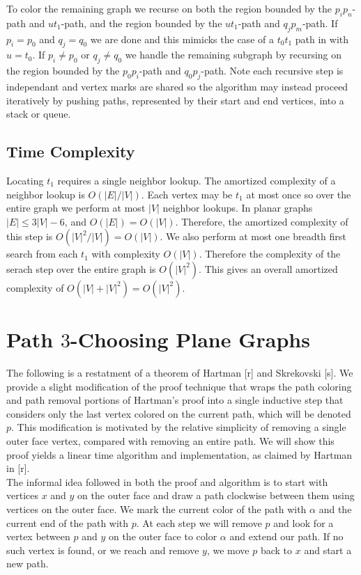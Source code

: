 \documentclass[11pt,letter]{article}
\begin{document}
\noindent To color the remaining graph we recurse on both the region
bounded by the $p_ip_n$-path and $ut_1$-path, and the region bounded by the $ut_1$-path and $q_jp_m$-path.
If $p_i=p_0$ and $q_j=q_0$ we are done and this mimicks the case of a $t_0t_1$ path in with $u=t_0$.
If $p_i\ne p_0$ or $q_j\ne q_0$ we handle the remaining subgraph by recursing on the region bounded by the
$p_0p_i$-path and $q_0p_j$-path. Note each recursive step is independant and vertex marks are shared so the
algorithm may instead proceed iteratively by pushing paths, represented by their start and end
vertices, into a stack or queue.

\subsection*{Time Complexity}

\noindent Locating $t_1$ requires a single neighbor lookup. The amortized complexity of a neighbor lookup is
$O(|E|/|V|)$. Each vertex may be $t_1$ at most once so over the entire graph we perform at most $|V|$ neighbor
lookups. In planar graphs $|E|\le 3|V|-6$, and $O(|E|)=O(|V|)$. Therefore, the
amortized complexity of this step is $O(|V|^2/|V|)=O(|V|)$. We also perform at most one breadth first
search from each $t_1$ with complexity $O(|V|)$. Therefore the complexity of the serach step over the
entire graph is $O(|V|^2)$. This gives an overall amortized complexity of $O(|V|+|V|^2)=O(|V|^2)$.

\section{Path $3$-Choosing Plane Graphs}

The following is a restatment of a theorem of Hartman [r] and Skrekovski [s]. We provide a slight modification of
the proof technique that wraps the path coloring and path removal portions of Hartman's proof into a single inductive
step that considers only the last vertex colored on the current path, which will be denoted $p$.
This modification is motivated by the relative simplicity of removing a single outer face vertex,
compared with removing an entire path.
We will show this proof yields a linear time algorithm and implementation, as claimed by Hartman in [r].\\

\noindent The informal idea followed in both the proof and algorithm is to start with
vertices $x$ and $y$ on the outer face and draw a path clockwise between them using vertices on the outer face.
We mark the current color of the path with $\alpha$ and the current end of the path with $p$. At each step we will remove
$p$ and look for a vertex between $p$ and $y$ on the outer face to color $\alpha$ and extend our path. If no
such vertex is found, or we reach and remove $y$, we move $p$ back to $x$ and start a new path.\\
\end{document}
